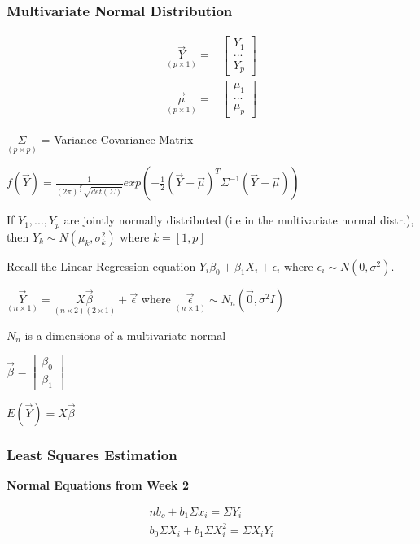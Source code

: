 \documentclass[11pt]{article}
\begin{document}
\subsubsection{Multivariate Normal Distribution}
\label{sec:orgbc73895}
\begin{equation}
\begin{split}
\underset{(p \times 1)}{\vec{Y}} = & \begin{bmatrix}
Y_1\\
...\\
Y_p
\end{bmatrix}\\
\underset{(p \times 1)}{\vec{\mu}} = & \begin{bmatrix}
\mu_1\\
...\\
\mu_p
\end{bmatrix}
\end{split}
\end{equation}


\(\underset{(p \times p)}{\Sigma}\) = Variance-Covariance Matrix

\(f(\vec{Y}) = \frac{1}{(2 \pi )^{\frac{P}{2}}
\sqrt{det(\Sigma)}}exp(-\frac{1}{2}(\vec{Y} - \vec{\mu})^T \Sigma^{-1}
(\vec{Y} - \vec{\mu}))\)

If \(Y_1, ..., Y_p\) are jointly normally distributed (i.e in the multivariate
normal distr.), then \(Y_k \sim N(\mu_k, \sigma^2_k)\) where \(k = [1, p]\)

Recall the Linear Regression equation \(Y_i \beta_0 + \beta_1 X_i + \epsilon_i\)
where \(\epsilon_i \sim N(0, \sigma^2)\).

\(\underset{(n \times 1)}{\vec{Y}} = \underset{(n \times 2)(2 \times 1)}{X
\vec{\beta}} + \vec{\epsilon}\) where \(\underset{(n \times 1)}{\vec{\epsilon}}
\sim N_n(\vec{0}, \sigma^2 I)\)

\(N_n\) is a dimensions of a multivariate normal

\(\vec{\beta} = \begin{bmatrix}
\beta_0\\
\beta_1
\end{bmatrix}\)

\(E(\vec{Y}) = X \vec{\beta}\)

\subsubsection{Least Squares Estimation}
\label{sec:org1eecc2a}
\textbf{Normal Equations from Week 2}

\begin{equation}
\begin{split}
n b_o + b_1 \Sigma x_i = \Sigma Y_i\\
b_0 \Sigma X_i + b_1 \Sigma X_i^2 = \Sigma X_i Y_i
\end{split}
\end{equation}
\end{document}
